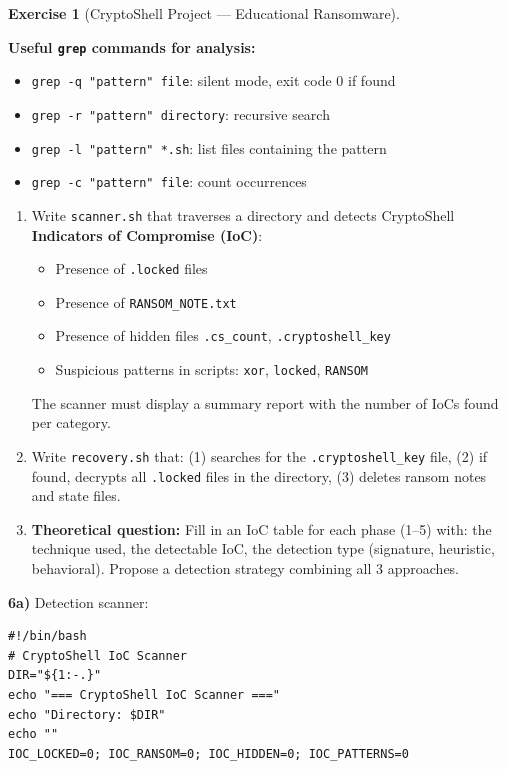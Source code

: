 \documentclass[a4paper,11pt]{article}
\theoremstyle{plain}
\theoremstyle{definition}
\newtheorem{exercice}{Exercise}
\begin{document}
\begin{exercice}[CryptoShell Project --- Educational Ransomware]
\begin{rappel}
\medskip
\textbf{Useful \texttt{grep} commands for analysis:}
\begin{itemize}
    \item \texttt{grep -q "pattern" file}: silent mode, exit code 0 if found
    \item \texttt{grep -r "pattern" directory}: recursive search
    \item \texttt{grep -l "pattern" *.sh}: list files containing the pattern
    \item \texttt{grep -c "pattern" file}: count occurrences
\end{itemize}
\end{rappel}

\begin{enumerate}
\item[\textbf{6a)}] Write \texttt{scanner.sh} that traverses a directory and detects CryptoShell \textbf{Indicators of Compromise (IoC)}:
\begin{itemize}
    \item Presence of \texttt{.locked} files
    \item Presence of \texttt{RANSOM\_NOTE.txt}
    \item Presence of hidden files \texttt{.cs\_count}, \texttt{.cryptoshell\_key}
    \item Suspicious patterns in scripts: \texttt{xor}, \texttt{locked}, \texttt{RANSOM}
\end{itemize}
The scanner must display a summary report with the number of IoCs found per category.

\item[\textbf{6b)}] Write \texttt{recovery.sh} that: (1) searches for the \texttt{.cryptoshell\_key} file, (2) if found, decrypts all \texttt{.locked} files in the directory, (3) deletes ransom notes and state files.

\item[\textbf{6c)}] \textbf{Theoretical question:} Fill in an IoC table for each phase (1--5) with: the technique used, the detectable IoC, the detection type (signature, heuristic, behavioral). Propose a detection strategy combining all 3 approaches.
\end{enumerate}

\begin{correction}

\textbf{6a)} Detection scanner:
\begin{lstlisting}[title=scanner.sh (phase6\_scanner.sh)]
#!/bin/bash
# CryptoShell IoC Scanner
DIR="${1:-.}"
echo "=== CryptoShell IoC Scanner ==="
echo "Directory: $DIR"
echo ""
IOC_LOCKED=0; IOC_RANSOM=0; IOC_HIDDEN=0; IOC_PATTERNS=0


\end{lstlisting}
\end{correction}
\end{exercice}
\end{document}
